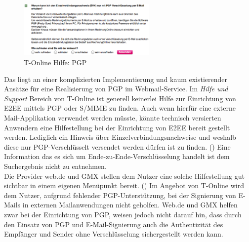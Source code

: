 \documentclass  [paper=a4,
				fontsize=12pt,
				listof=totoc,
				bibliography=totoc
				]{scrreprt}
\begin{document}
			\begin{figure} %
				\vspace{-12pt}
				\centering
				\includegraphics[width=0.6\textwidth]{images/T-Online_Hilfe_PGP}
				\caption[T-Online PGP]{T-Online Hilfe: PGP} 
				\label{fig:T-Online_Hilfe_PGP} %
				\vspace{-12pt}
			\end{figure}
			Das liegt an einer komplizierten Implementierung und kaum existierender Ansätze für eine Realisierung von PGP im Webmail-Service.
			Im \textit{Hilfe und Support} Bereich von T-Online ist generell keinerlei Hilfe zur Einrichtung von E2EE mittels PGP oder S/MIME zu finden.
			Auch wenn hierfür eine externe Mail-Applikation verwendet werden müsste, könnte technisch versierten Anwendern eine Hilfestellung bei der Einrichtung von E2EE bereit gestellt werden.
			Lediglich ein Hinweis über Einzelverbindungsnachweise und weshalb diese nur PGP-Verschlüsselt versendet werden dürfen ist zu finden. ()
			Eine Information das es sich um Ende-zu-Ende-Verschlüsselung handelt ist dem Suchergebnis nicht zu entnehmen.\\
			Die Provider web.de und GMX stellen dem Nutzer eine solche Hilfestellung gut sichtbar in einem eigenen Menüpunkt bereit. ()
			Im Angebot von T-Online wird dem Nutzer, aufgrund fehlender PGP-Unterstützung, bei der Signierung von E-Mails in externen Mailanwendungen nicht geholfen. 
			Web.de und GMX helfen zwar bei der Einrichtung von PGP, weisen jedoch nicht darauf hin, dass durch den Einsatz von PGP und E-Mail-Signierung auch die Authentizität des Empfänger und Sender ohne Verschlüsselung sichergestellt werden kann. \\
			
\end{document}
